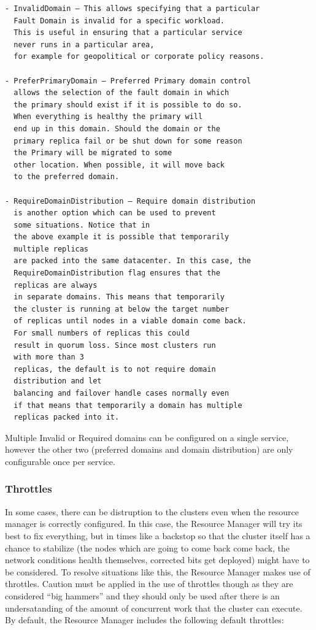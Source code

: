 \begin{verbatim}
- InvalidDomain – This allows specifying that a particular
  Fault Domain is invalid for a specific workload.
  This is useful in ensuring that a particular service
  never runs in a particular area,
  for example for geopolitical or corporate policy reasons.
 
- PreferPrimaryDomain – Preferred Primary domain control
  allows the selection of the fault domain in which
  the primary should exist if it is possible to do so. 
  When everything is healthy the primary will
  end up in this domain. Should the domain or the
  primary replica fail or be shut down for some reason
  the Primary will be migrated to some
  other location. When possible, it will move back
  to the preferred domain.

- RequireDomainDistribution – Require domain distribution
  is another option which can be used to prevent
  some situations. Notice that in
  the above example it is possible that temporarily
  multiple replicas
  are packed into the same datacenter. In this case, the
  RequireDomainDistribution flag ensures that the 
  replicas are always
  in separate domains. This means that temporarily
  the cluster is running at below the target number
  of replicas until nodes in a viable domain come back. 
  For small numbers of replicas this could
  result in quorum loss. Since most clusters run
  with more than 3
  replicas, the default is to not require domain
  distribution and let
  balancing and failover handle cases normally even
  if that means that temporarily a domain has multiple
  replicas packed into it.
\end{verbatim}

Multiple Invalid or Required domains can be configured on a single
service, however the other two (preferred domains and domain
distribution) are only configurable once per service.

\subsubsection{Throttles}
In some cases, there can be distruption to the clusters
even when the resource manager is correctly configured. 
In this case, the Resource Manager will try its best to fix
everything, but in times like a backstop so that the cluster itself
has a chance to stabilize (the nodes which are going to come back come
back, the network conditions health themselves, corrected bits get
deployed) might have to be considered. To resolve situations like this, 
the Resource Manager makes use of throttles. Caution must be applied in 
the use of throttles though
as they are considered “big hammers” and they should only be used after 
there is an undersatanding of the amount of
concurrent work that the cluster can execute. 
By default, the Resource Manager includes the
following default throttles:

